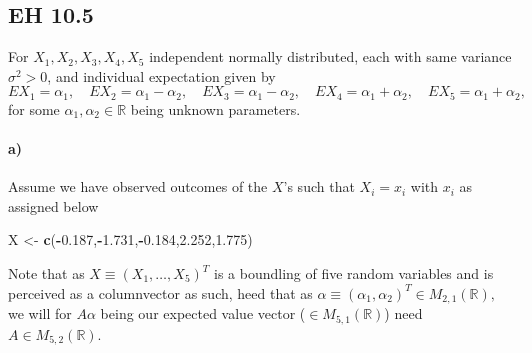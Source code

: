 \documentclass[
]{article}
\newenvironment{Shaded}{\begin{snugshade}}{\end{snugshade}}
\newcommand{\FloatTok}[1]{\textcolor[rgb]{0.00,0.00,0.81}{#1}}
\newcommand{\KeywordTok}[1]{\textcolor[rgb]{0.13,0.29,0.53}{\textbf{#1}}}
\newcommand{\NormalTok}[1]{#1}
\newcommand{\OperatorTok}[1]{\textcolor[rgb]{0.81,0.36,0.00}{\textbf{#1}}}
\newcommand{\StringTok}[1]{\textcolor[rgb]{0.31,0.60,0.02}{#1}}
\begin{document}
\hypertarget{eh-10.5}{%
\subsection{EH 10.5}\label{eh-10.5}}

For \(X_1,X_2,X_3,X_4,X_5\) independent normally distributed, each with
same variance \(\sigma^2>0\), and individual expectation given by \[
EX_1=\alpha_1,\quad EX_2=\alpha_1-\alpha_2,\quad EX_3 = \alpha_1-\alpha_2,\quad EX_4 = \alpha_1+\alpha_2,\quad EX_5 = \alpha_1+\alpha_2,
\] for some \(\alpha_1,\alpha_2\in\mathbb{R}\) being unknown parameters.

\hypertarget{a}{%
\paragraph{\texorpdfstring{\textbf{a)}}{a)}}\label{a}}

Assume we have observed outcomes of the \(X\)'s such that \(X_i=x_i\)
with \(x_i\) as assigned below

\begin{Shaded}
\begin{Highlighting}[]
\NormalTok{X <-}\StringTok{ }\KeywordTok{c}\NormalTok{(}\OperatorTok{-}\FloatTok{0.187}\NormalTok{,}\OperatorTok{-}\FloatTok{1.731}\NormalTok{,}\OperatorTok{-}\FloatTok{0.184}\NormalTok{,}\FloatTok{2.252}\NormalTok{,}\FloatTok{1.775}\NormalTok{)}
\end{Highlighting}
\end{Shaded}

Note that as \(X\equiv\left({X_1,\ldots,X_5}\right)^T\) is a boundling
of five random variables and is perceived as a columnvector as such,
heed that as
\(\alpha\equiv\left({\alpha_1,\alpha_2}\right)^T\in M_{2,1}(\mathbb{R}),\)
we will for \(A\alpha\) being our expected value vector
(\(\in M_{5,1}(\mathbb{R})\)) need \(A\in M_{5,2}(\mathbb{R}).\)
\end{document}
